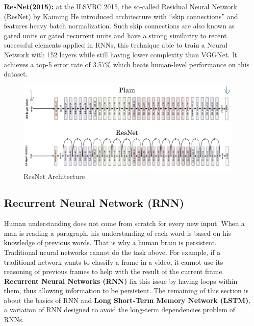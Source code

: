 \vspace{-1cm}
\textbf{ResNet(2015):} at the ILSVRC 2015, the so-called Residual Neural Network (ResNet) by Kaiming He introduced architecture with “skip connections” and features heavy batch normalization. Such skip connections are also known as gated units or gated recurrent units and have a strong similarity to recent successful elements applied in RNNs, this technique able to train a Neural Network with 152 layers while still having lower complexity than VGGNet. It achieves a top-5 error rate of 3.57\% which beats human-level performance on this dataset.
\begin{center}
  \begin{figure}[H]
  \centering
  \includegraphics[width=1\columnwidth]{images/chap2/ResNet_Plain_Vs_Res.png}
  \caption{ResNet Architecture}
  \label{chap2:WSP}
  \end{figure}
\end{center}
\vspace{-1cm}
\subsection{Recurrent Neural Network (RNN)}
Human understanding does not come from scratch for every new input. When a man is reading a paragraph, his understanding of each word is based on his knowledge of previous words. That is why a human brain is persistent.\\
Traditional neural networks cannot do the task above. For example, if a traditional network wants to classify a frame in a video, it cannot use its reasoning of previous frames to help with the result of the current frame.\\
\textbf{Recurrent Neural Networks (RNN)} fix this issue by having loops within them, thus allowing information to be persistent. The remaining of this section is about the basics of RNN and \textbf{Long Short-Term Memory Network (LSTM)}, a variation of RNN designed to avoid the long-term dependencies problem of RNNs.


